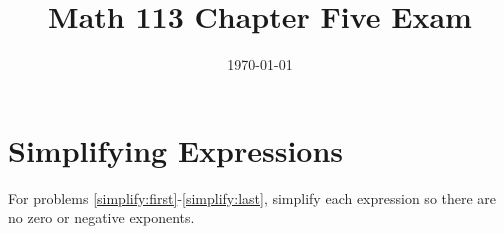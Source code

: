 \documentclass[fleqn,addpoints]{exam}
\title{Math 113 Chapter Five Exam}
\author{}
\date{\today}
\begin{document}
\maketitle

\ifprintanswers
\else
\vspace{0.2in}
\vspace{0.2in}

\begin{center}
\gradetable[h][pages]
\end{center}

\fi

\section{Simplifying  Expressions}

For problems \ref{simplify:first}-\ref{simplify:last}, simplify each expression so there are no zero or negative exponents.
\end{document}
